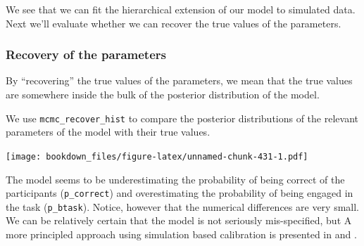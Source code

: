 \documentclass[12pt,]{krantz}
\newenvironment{Shaded}{\begin{snugshade}}{\end{snugshade}}
\newcommand{\KeywordTok}[1]{\textcolor[rgb]{0.13,0.29,0.53}{\textbf{#1}}}
\newcommand{\DecValTok}[1]{\textcolor[rgb]{0.00,0.00,0.81}{#1}}
\newcommand{\StringTok}[1]{\textcolor[rgb]{0.31,0.60,0.02}{#1}}
\newcommand{\OperatorTok}[1]{\textcolor[rgb]{0.81,0.36,0.00}{\textbf{#1}}}
\newcommand{\NormalTok}[1]{#1}
\theoremstyle{definition}
\theoremstyle{definition}
\theoremstyle{definition}
\theoremstyle{remark}
\begin{document}
We see that we can fit the hierarchical extension of our model to
simulated data. Next we'll evaluate whether we can recover the true
values of the parameters.

\subsubsection{Recovery of the
parameters}\label{recovery-of-the-parameters}

By ``recovering'' the true values of the parameters, we mean that the
true values are somewhere inside the bulk of the posterior distribution
of the model.

We use \texttt{mcmc\_recover\_hist} to compare the posterior
distributions of the relevant parameters of the model with their true
values.

\begin{Shaded}
\end{Shaded}

\texttt{[image: bookdown\_files/figure-latex/unnamed-chunk-431-1.pdf]}

The model seems to be underestimating the probability of being correct
of the participants (\texttt{p\_correct}) and overestimating the
probability of being engaged in the task (\texttt{p\_btask}). Notice,
however that the numerical differences are very small. We can be
relatively certain that the model is not seriously mis-specified, but A
more principled approach using simulation based calibration is presented
in \citet{talts2018validating} and \citet{schad2020toward}.
\end{document}
